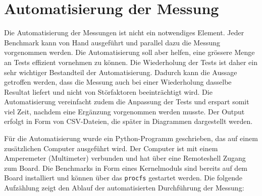 \section{Automatisierung der Messung}
\label{sec:automatisierung}

Die Automatisierung der Messungen ist nicht ein notwendiges Element. Jeder Benchmark kann von Hand ausgeführt und parallel dazu die Messung vorgenommen werden. Die Automatisierung soll aber helfen, eine grössere Menge an Tests effizient vornehmen zu können. Die Wiederholung der Tests ist daher ein sehr wichtiger Bestandteil der Automatisierung. Dadurch kann die Aussage getroffen werden, dass die Messung auch bei einer Wiederholung dasselbe Resultat liefert und nicht von Störfaktoren beeinträchtigt wird. Die Automatisierung vereinfacht zudem die Anpassung der Tests und erspart somit viel Zeit, nachdem eine Ergänzung vorgenommen werden musste. Der Output erfolgt in Form von CSV-Dateien, die später in Diagrammen dargestellt werden.
\par
Für die Automatisierung wurde ein Python-Programm geschrieben, das auf einem zusätzlichen Computer ausgeführt wird. Der Computer ist mit einem Amperemeter (Multimeter) verbunden und hat über eine Remoteshell Zugang zum Board. Die Benchmarks in Form eines Kernelmoduls sind bereits auf dem Board installiert und können über das \texttt{procfs} gestartet werden. Die folgende Aufzählung zeigt den Ablauf der automatisierten Durchführung der Messung:


